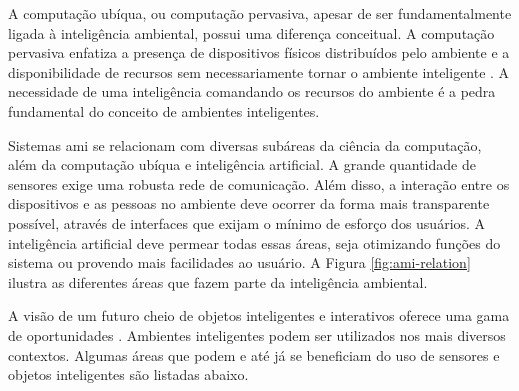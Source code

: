     
    A computação ubíqua, ou computação pervasiva, apesar de ser fundamentalmente ligada à inteligência ambiental, possui uma diferença conceitual. A computação pervasiva enfatiza a presença de dispositivos físicos distribuídos pelo ambiente e a disponibilidade de recursos sem necessariamente tornar o ambiente inteligente \cite{augusto2007ambient}. A necessidade de uma inteligência comandando os recursos do ambiente é a pedra fundamental do conceito de ambientes inteligentes.
    
    
    Sistemas \acrshort{ami} se relacionam com diversas subáreas da ciência da computação, além da computação ubíqua e inteligência artificial. A grande quantidade de sensores exige uma robusta rede de comunicação. Além disso, a interação entre os dispositivos e as pessoas no ambiente deve ocorrer da forma mais transparente possível, através de interfaces que exijam o mínimo de esforço dos usuários. A inteligência artificial deve permear todas essas áreas, seja otimizando funções do sistema ou provendo mais facilidades ao usuário. A Figura \ref{fig:ami-relation} ilustra as diferentes áreas que fazem parte da inteligência ambiental.
    
    \begin{figure}[h!]
        \centering
    \end{figure}
    
    A visão de um futuro cheio de objetos inteligentes e interativos oferece uma gama de oportunidades \cite{bohn2005social}. Ambientes inteligentes podem ser utilizados nos mais diversos contextos. Algumas áreas que podem e até já se beneficiam do uso de sensores e objetos inteligentes são listadas abaixo.
    
